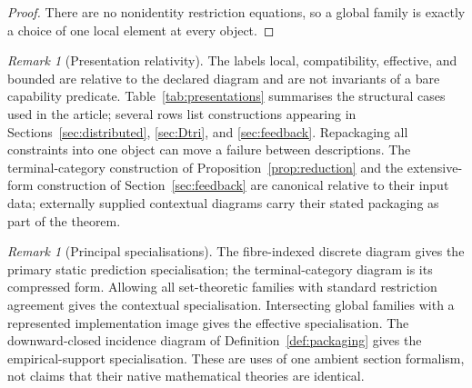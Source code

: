 \documentclass[11pt]{article}
\theoremstyle{plain}
\theoremstyle{definition}
\theoremstyle{remark}
\newtheorem{remark}[theorem]{Remark}
\begin{document}
\begin{proof}
There are no nonidentity restriction equations, so a global family is exactly a
choice of one local element at every object.
\end{proof}

\begin{remark}[Presentation relativity]\label{rem:presentation}
The labels local, compatibility, effective, and bounded are relative to the
declared diagram and are not invariants of a bare capability predicate. Table~\ref{tab:presentations} summarises the structural cases used in the article; several rows list constructions appearing in Sections~\ref{sec:distributed}, \ref{sec:Dtri}, and \ref{sec:feedback}. Repackaging all constraints into one object can move a failure
between descriptions. The terminal-category construction of Proposition~\ref{prop:reduction} and the extensive-form
construction of Section~\ref{sec:feedback} are canonical relative to their input
data; externally supplied contextual diagrams carry their stated packaging as
part of the theorem.
\end{remark}







\begin{remark}[Principal specialisations]
The fibre-indexed discrete diagram gives the primary static prediction
specialisation; the terminal-category diagram is its compressed form. Allowing all
set-theoretic families with standard restriction agreement gives the contextual
specialisation. Intersecting global families with a represented implementation
image gives the effective specialisation. The downward-closed incidence diagram
of Definition~\ref{def:packaging} gives the empirical-support specialisation.
These are uses of one ambient section formalism, not claims that their native
mathematical theories are identical.
\end{remark}
\end{document}
